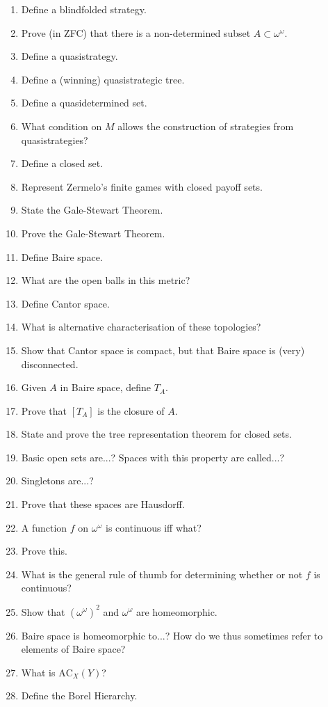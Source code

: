 \documentclass[]{article}
\newcommand{\om}{\omega}
\renewcommand{\ac}{\textrm{AC}}
\begin{document}
\begin{enumerate}
    \item Define a blindfolded strategy.
    \item Prove (in ZFC) that there is a non-determined subset $A\subset \om^\om$.
    \item Define a quasistrategy.
    \item Define a (winning) quasistrategic tree.
    \item Define a quasidetermined set.
    \item What condition on $M$ allows the construction of strategies from quasistrategies?
    \item Define a closed set.
    \item Represent Zermelo's finite games with closed payoff sets.
    \item State the Gale-Stewart Theorem.
    \item Prove the Gale-Stewart Theorem.
    \item Define Baire space.
    \item What are the open balls in this metric?
    \item Define Cantor space.
    \item What is alternative characterisation of these topologies?
    \item Show that Cantor space is compact, but that Baire space is (very) disconnected.
    \item Given $A$ in Baire space, define $T_A$.
    \item Prove that $[T_A]$ is the closure of $A$.
    \item State and prove the tree representation theorem for closed sets.
    \item Basic open sets are...? Spaces with this property are called...?
    \item Singletons are...?
    \item Prove that these spaces are Hausdorff.
    \item A function $f$ on $\om^\om$ is continuous iff what?
    \item Prove this.
    \item What is the general rule of thumb for determining whether or not $f$ is continuous?
    \item Show that $(\om^\om)^2$ and $\om^\om$ are homeomorphic.
    \item Baire space is homeomorphic to...? How do we thus sometimes refer to elements of Baire space?
    \item What is $\ac_X(Y)$?
    \item Define the Borel Hierarchy.

\end{enumerate}
\end{document}
